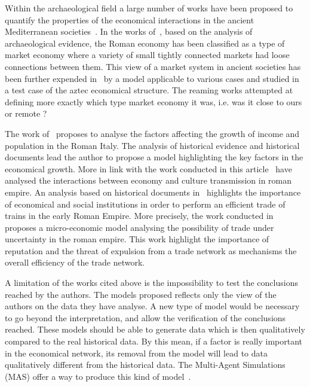 \documentclass{wscpaperproc}
\begin{document}
Within the archaeological field a large number of works have been proposed to quantify the properties of the economical interactions in the ancient Mediterranean societies~\cite{hopkins_taxes_1980,temin_market_2001,terpstra_trade_2011,minc_monitoring_2006,temin_economy_2006,wilson_approaches_2009,scheidel_model_2007,kessler_organization_2007}. In the works of~\cite{temin_market_2001,temin_economy_2006,wilson_approaches_2009}, based on the analysis of archaeological evidence, the Roman economy has been classified as a type of market economy where a variety of small tightly connected markets had loose connections between them. This view of a market system in ancient societies has been further expended in~\cite{minc_monitoring_2006} by a model applicable to various cases and studied in a test case of the aztec economical structure. The reaming works attempted at defining more exactly which type market economy it was, i.e. was it close to ours or remote ? 


The work of~\cite{scheidel_model_2007} proposes to analyse the factors affecting the growth of income and population in the Roman Italy. The analysis of historical evidence and historical documents lead the author to propose a model highlighting the key factors in the economical growth. More in link with the work conducted in this article~\cite{terpstra_trade_2011,kessler_organization_2007} have analysed the interactions between economy and culture transmission in roman empire. An analysis based on historical documents in~\cite{kessler_organization_2007} highlights the importance of economical and social institutions in order to perform an efficient trade of trains in the early Roman Empire. More precisely, the work conducted in~\cite{terpstra_trade_2011} proposes a micro-economic model analysing the possibility of trade under uncertainty in the roman empire. This work highlight the importance of reputation and the threat of expulsion from a trade network as mechanisms the overall efficiency of the trade network. 


A limitation of the works cited above is the impossibility to test the conclusions reached by the authors. The models proposed reflects only the view of the authors on the data they have analyse. A new type of model would be necessary to go beyond the interpretation, and allow the verification of the conclusions reached. These models should be able to generate data which is then qualitatively compared to the real historical data. By this mean, if a factor is really important in the economical network, its removal from the model will lead to data qualitatively different from the historical data. The Multi-Agent Simulations (MAS) offer a way to produce this kind of model~\cite{lake_trends_2014}.
\end{document}

